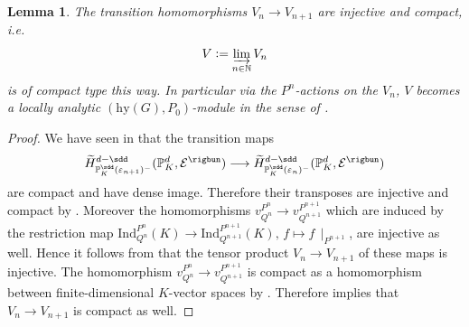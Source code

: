 \documentclass[a4paper, reqno, 10pt]{amsart}
\newtheorem{lemma}[theorem]{Lemma}
\theoremstyle{definition}
\numberwithin{equation}{section}
\newcommand{\defeq}{\vcentcolon=}
\newcommand{\hy}{{\mathrm{hy}}}
\newcommand{\Ind}{{\mathrm{Ind}}}
\newcommand{\lra}{\longrightarrow}
\newcommand{\mto}{\mapsto}
\newcommand{\ra}{\rightarrow}
\newcommand{\res}[1]{{\!\,\mid_{#1}}}
\newcommand{\BN}{{\mathbb {N}}}
\newcommand{\BP}{{\mathbb {P}}}
\newcommand{\CE}{{\mathcal {E}}}
\begin{document}
\begin{lemma}\label{Lemma 3 - Limit of the local cohomology as a locally analytic representation}
	The transition homomorphisms $V_{n}\ra V_{n+1}$ are injective and compact, i.e.\
	\[ V \defeq \varinjlim_{n\in \BN} V_n \]
	is of compact type this way.
	In particular via the $P^n$-actions on the $V_n$, $V$ becomes a locally analytic $(\hy(G),P_0)$-module in the sense of .
\end{lemma}
\begin{proof}
	We have seen in  that the transition maps
	\[\widetilde{H}^{d-\sdd}_{\BP_K^\sdd(\varepsilon_{n+1})^-} (\BP_K^d, \CE^\rigbun) \lra \widetilde{H}^{d-\sdd}_{\BP_K^\sdd(\varepsilon_{n})^-} (\BP_K^d, \CE^\rigbun) \]
	are compact and have dense image.
	Therefore their transposes are injective and compact by \cite[Lemma 16.4]{Schneider02NonArchFunctAna}.
	Moreover the homomorphisms $v^{P^n}_{Q^n} \ra v^{P^{n+1}}_{Q^{n+1}}$ which are induced by the restriction map $\Ind^{P^n}_{Q^n} (K) \ra \Ind^{P^{n+1}}_{Q^{n+1}} (K),\, f \mto f\res{P^{n+1}}$, are injective as well.
	Hence it follows from \cite[Cor.\ 1.1.27]{Emerton17LocAnVect} that the tensor product $V_n \ra V_{n+1}$ of these maps is injective.
	The homomorphism $v^{P^n}_{Q^n} \ra v^{P^{n+1}}_{Q^{n+1}}$ is compact as a homomorphism between finite-di\-men\-sion\-al $K$-vector spaces by \cite[Lemma 16.4]{Schneider02NonArchFunctAna}.
	Therefore \cite[Lemma 18.12]{Schneider02NonArchFunctAna} implies that $V_n\ra V_{n+1}$ is compact as well.
	

\end{proof}
\end{document}
